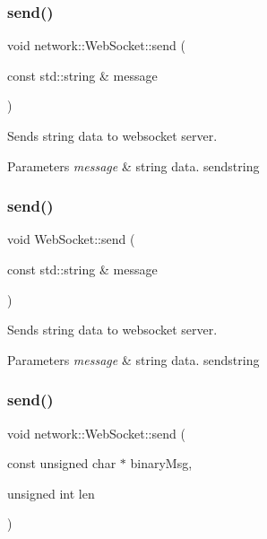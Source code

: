 \subsubsection{\texorpdfstring{send()}{send()}\hspace{0.1cm}{\footnotesize\ttfamily [1/4]}}
{\footnotesize\ttfamily void network\+::\+Web\+Socket\+::send (\begin{DoxyParamCaption}\item[{const std\+::string \&}]{message }\end{DoxyParamCaption})}



Sends string data to websocket server. 


\begin{DoxyParams}{Parameters}
{\em message} & string data.  sendstring \\
\hline
\end{DoxyParams}
\mbox{\label{classnetwork_1_1WebSocket_a6a17081724ba19e6644521745adb6d04}} 
\subsubsection{\texorpdfstring{send()}{send()}\hspace{0.1cm}{\footnotesize\ttfamily [2/4]}}
{\footnotesize\ttfamily void Web\+Socket\+::send (\begin{DoxyParamCaption}\item[{const std\+::string \&}]{message }\end{DoxyParamCaption})}



Sends string data to websocket server. 


\begin{DoxyParams}{Parameters}
{\em message} & string data.  sendstring \\
\hline
\end{DoxyParams}
\mbox{\label{classnetwork_1_1WebSocket_aca55172b70d11ae5e7456853d61f2c63}} 
\subsubsection{\texorpdfstring{send()}{send()}\hspace{0.1cm}{\footnotesize\ttfamily [3/4]}}
{\footnotesize\ttfamily void network\+::\+Web\+Socket\+::send (\begin{DoxyParamCaption}\item[{const unsigned char $\ast$}]{binary\+Msg,  }\item[{unsigned int}]{len }\end{DoxyParamCaption})}



